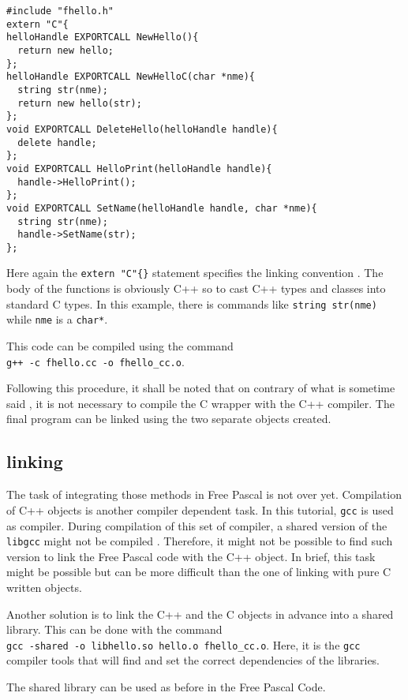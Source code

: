 \documentclass[A4paper]{article}
\begin{document}
\begin{verbatim}
#include "fhello.h"
extern "C"{
helloHandle EXPORTCALL NewHello(){
  return new hello;
};
helloHandle EXPORTCALL NewHelloC(char *nme){
  string str(nme);
  return new hello(str);
};
void EXPORTCALL DeleteHello(helloHandle handle){
  delete handle;
};
void EXPORTCALL HelloPrint(helloHandle handle){
  handle->HelloPrint();
};
void EXPORTCALL SetName(helloHandle handle, char *nme){
  string str(nme);
  handle->SetName(str);
};
\end{verbatim}

Here again the \verb|extern "C"{}| statement specifies the linking
convention \cite{C++}. The body of the functions is obviously C++ so to
cast C++ types and classes into standard C types. In
this example, there is commands like \verb|string str(nme)| while \verb|nme|
is a \verb|char*|.

This code can be compiled using the command
\\\verb|g++ -c fhello.cc -o fhello_cc.o|.

Following this procedure, it shall be noted that on contrary of what is
sometime said \cite{Cline2006}, it is not necessary to compile the C wrapper
with the C++ compiler. The final program can be linked using the two separate
objects created.

\subsection{linking}

The task of integrating those methods in Free Pascal is not over
yet. Compilation of C++ objects is another compiler dependent task. In this
tutorial, \verb|gcc| is used as compiler. During compilation of this set of
compiler, a shared version of the \verb|libgcc| might not be compiled
\cite{gcc}. Therefore, it might not be possible to find such version to link
the Free Pascal code with the C++ object. In brief, this task might be
possible but can be more difficult than the one of linking with pure C written
objects.

Another solution is to link the C++ and the C objects in advance into a shared
library. This can be done with the command
\\\verb|gcc -shared -o libhello.so hello.o fhello_cc.o|.
Here, it is the \verb|gcc| compiler tools that
will find and set the correct dependencies of the libraries.

The shared library can be used as before in the Free Pascal Code.
\end{document}

